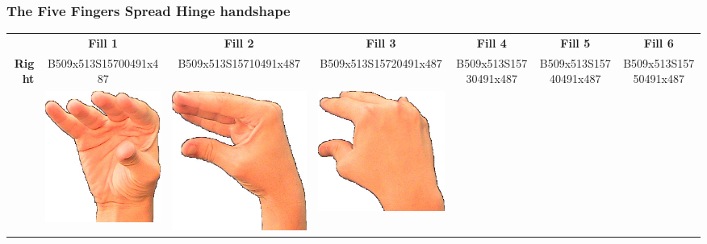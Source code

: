 \documentclass{article}
\begin{document}
\subsubsection{The Five Fingers Spread Hinge handshape}

\begin{center}
\begin{tabular}{r*{6}{c}}
&\textbf{Fill 1}&\textbf{Fill 2}&\textbf{Fill 3}&\textbf{Fill 4}&\textbf{Fill 5}&\textbf{Fill 6}\\
\multirow{2}{*}{\textbf{Right}}&
B509x513S15700491x487&
B509x513S15710491x487&
B509x513S15720491x487&
B509x513S15730491x487&
B509x513S15740491x487&
B509x513S15750491x487\\
&
\includegraphics[scale=0.1]{images/05-09-1.jpg}&
\includegraphics[scale=0.1]{images/05-09-2.jpg}&
\includegraphics[scale=0.1]{images/05-09-3.jpg}&

\end{tabular}
\end{center}
\end{document}
